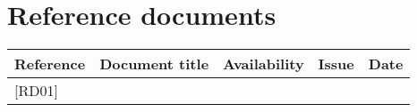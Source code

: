 \section*{Reference documents}
\begin{table}[htp]
\centering
\renewcommand{\arraystretch}{1.2} %
\begin{tabularx}{\textwidth}{|l|X|X|l|l|}
\hline
Reference & Document title & Availability & Issue & Date \\
\hline
{[}RD01{]} & & & & \\
\hline
\end{tabularx}
\end{table}
